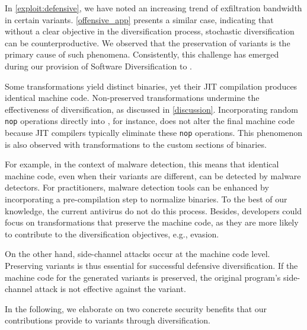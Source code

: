 \label{exploit:discussion_bad}

In \autoref{exploit:defensive}, we have noted an increasing trend of exfiltration bandwidth in certain variants. 
\autoref{offensive_app} presents a similar case, indicating that without a clear objective in the diversification process, stochastic diversification can be counterproductive. 
We observed that the preservation of variants is the primary cause of such phenomena. 
Consistently, this challenge has emerged during our provision of Software Diversification to \Wasm.


\begin{strategy}[Preservation]    
    Some transformations yield distinct \Wasm binaries, yet their JIT compilation produces identical machine code.
    Non-preserved transformations undermine the effectiveness of diversification, as discussed in \autoref{discussion}.
    Incorporating random \texttt{nop} operations directly into \Wasm, for instance, does not alter the final machine code because JIT compilers typically eliminate these \texttt{nop} operations.
    This phenomenon is also observed with transformations to the custom sections of \Wasm binaries.
\end{strategy}


For example, in the context of \Wasm malware detection, this means that identical machine code, even when their \Wasm variants are different, can be detected by malware detectors.
For practitioners, malware detection tools can be enhanced by incorporating a pre-compilation step to normalize \Wasm binaries.
To the best of our knowledge, the current antivirus do not do this process.
Besides, developers could focus on transformations that preserve the machine code, as they are more likely to contribute to the diversification objectives, e.g., evasion.

On the other hand, side-channel attacks occur at the machine code level. 
Preserving \Wasm variants is thus essential for successful defensive diversification. 
If the machine code for the generated variants is preserved, the original \Wasm program's side-channel attack is not effective against the variant.

\label{exploit:discussion_good}

In the following, we elaborate on two concrete security benefits that our contributions provide to \Wasm variants through diversification.
 
